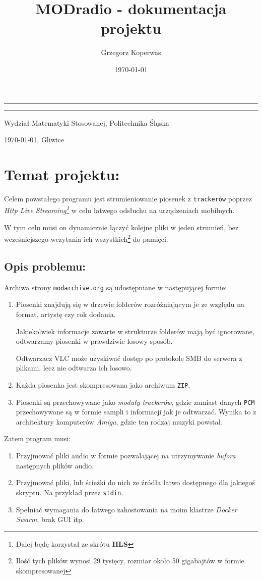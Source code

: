 \documentclass[a4paper,12pt]{article}
\title{MODradio - dokumentacja projektu}
\author{Grzegorz Koperwas}
\date{\today}
\renewcommand{\maketitle}{
    \begin{titlepage}
        \vspace*{2cm}
        
        \hspace{-3.4cm}\begin{minipage}{13cm}
            \hrule

            \vspace*{10pt}

            \hspace{15mm}\Large{\textbf{\thetitle}}

            \vspace*{5mm}

            \hspace{15mm}\large{\theauthor}

            \vspace*{10pt}

            \hrule
        \end{minipage}


        \vfill
    
        \begin{center}
            \footnotesize 
            Wydział Matematyki Stosowanej, Politechnika Śląska 
            
            \vspace*{1em}

            \today, Gliwice
        \end{center}
            
        \vspace*{1cm}
        
    \end{titlepage}
}
\begin{document}
\maketitle

\section{Temat projektu:}

Celem powstałego programu jest strumieniowanie piosenek z \texttt{trackerów}
poprzez \emph{Http Live Streaming\footnote{Dalej będę korzystał ze skrótu
\textbf{HLS}}} w celu łatwego odsłuchu na urządzeniach
mobilnych.

W tym celu musi on dynamicznie łączyć kolejne pliki w jeden strumień, bez
wcześniejszego wczytania ich wszystkich\footnote{Ilość tych plików wynosi 29 tysięcy,
rozmiar około 50 gigabajtów w formie skompresowanej} do pamięci.

\subsection*{Opis problemu:}

Archiwa strony \texttt{modarchive.org} są udostępniane w następującej formie:

\begin{enumerate}
        \item Piosenki znajdują się w drzewie folderów rozróżniającym je ze
            względu na format, artystę czy rok dodania. 

            Jakiekolwiek informacje zawarte w strukturze folderów mają być
            ignorowane, odtwarzamy piosenki w prawdziwie losowy sposób.

            Odtwarzacz VLC
            może uzyskiwać dostęp po protokole SMB do serwera z plikami, lecz
            nie odtwarza ich losowo.

        \item Każda piosenka jest skompresowana jako archiwum \texttt{ZIP}.

        \item Piosenki są przechowywane jako \emph{moduły trackerów}, gdzie
            zamiast danych \texttt{PCM} przechowywane są w formie sampli i
            informacji jak je odtwarzać. Wynika to z architektury komputerów
            \emph{Amiga}, gdzie ten rodzaj muzyki powstał.
\end{enumerate}

Zatem program musi:

\begin{enumerate}
        \item Przyjmować pliki audio w formie pozwalającej na utrzymywanie
            \emph{bufora} następnych plików audio.
        \item Przyjmować pliki, lub ścieżki do nich ze źródła łatwo dostępnego 
            dla jakiegoś skryptu. Na przykład przez \texttt{stdin}.
        \item Spełniać wymagania do łatwego zahostowania na moim klastrze
            \emph{Docker Swarm}, brak GUI itp.
\end{enumerate}
\end{document}

